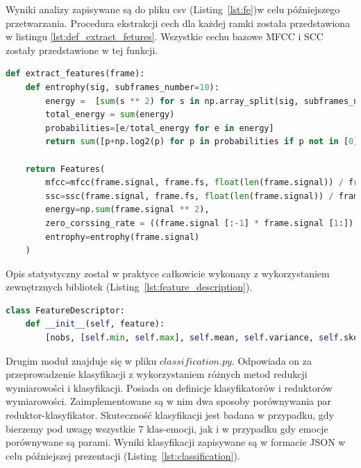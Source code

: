 \documentclass[a4paper,12pt,twoside,openany]{report}
\newcommand{\Lst}[1]{(Listing~\ref{#1})}
\begin{document}
Wyniki analizy zapisywane są do pliku csv \Lst{lst:fe}w celu późniejszego przetwarzania.
Procedura ekstrakcji cech dla każdej ramki została przedstawiona w listingu \ref{lst:def_extract_fetures}.
Wszystkie cechu bazowe MFCC i SCC zostały przedstawione w tej funkcji.

\begin{lstlisting}[language=python,caption={Ekstrakcja cech wypowiedzi},label={lst:def_extract_fetures}]
def extract_features(frame):
    def entrophy(sig, subframes_number=10):
        energy =  [sum(s ** 2) for s in np.array_split(sig, subframes_number)]
        total_energy = sum(energy)
        probabilities=[e/total_energy for e in energy]
        return sum([p+np.log2(p) for p in probabilities if p not in [0]])

    return Features(
        mfcc=mfcc(frame.signal, frame.fs, float(len(frame.signal)) / frame.fs, winfunc=np.hamming)[0],
        ssc=ssc(frame.signal, frame.fs, float(len(frame.signal)) / frame.fs, winfunc=np.hamming)[0],
        energy=np.sum(frame.signal ** 2),
        zero_corssing_rate = ((frame.signal [:-1] * frame.signal [1:]) < 0).sum(),
        entrophy=entrophy(frame.signal)
    )
\end{lstlisting}

Opis statystyczny został w praktyce całkowicie wykonany z wykorzystaniem zewnętrznych bibliotek \Lst{lst:feature_description}. 

\begin{lstlisting}[language=python,caption={Opis statystyczny cech},label={lst:feature_description}]
class FeatureDescriptor:
    def __init__(self, feature):
        [nobs, [self.min, self.max], self.mean, self.variance, self.skewness, self.kurtosis] = stats.describe(feature)
\end{lstlisting}

Drugim moduł znajduje się w pliku $classification.py$.
Odpowiada on za przeprowadzenie klasyfikacji z wykorzystaniem różnych metod redukcji wymiarowości i klasyfikacji.
Posiada on definicje klasyfikatorów i reduktorów wymiarowości. 
Zaimplementowane są w nim dwa sposoby porównywania par reduktor-klasyfikator.
Skuteczność klasyfikacji jest badana w przypadku, gdy bierzemy pod uwagę wszystkie 7 klas-emocji, jak i w przypadku gdy emocje porównywane są parami.
Wyniki klasyfikacji zapisywane są w formacie JSON w celu późniejszej prezentacji \Lst{lst:classification}.
\end{document}
